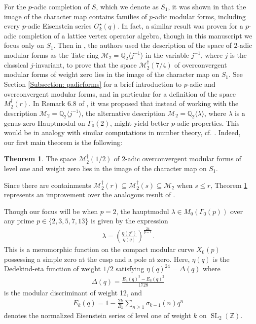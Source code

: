 \documentclass[10pt,a4paper]{amsart}
\numberwithin{equation}{section}
\theoremstyle{definition}
\newtheorem{Th}{Theorem}[section]
\newcommand{\Heis}{S}
\newcommand{\pHeis}{S_{1}}
\newcommand{\twomodforms}{\mathcal{M}_{2}}
\newcommand{\twooverconv}[1]{\twomodforms^{\dagger} (#1)}
\newcommand{\haupt}{\lambda}
\DeclareMathOperator{\SL}{SL}
\begin{document}
For the $p$-adic completion of $\Heis$, which we denote as $\pHeis$, it was shown in \cite{BF24} that the image of the character map contains families of $p$-adic modular forms, including every $p$-adic Eisenstein series $G_{k}^{\star}(q)$. In fact, a similar result was proven for a $p$-adic completion of a lattice vertex operator algebra, though in this manuscript we focus only on $\pHeis$. Then in \cite{FM23a}, the authors used the description of the space of $2$-adic modular forms as the Tate ring $\twomodforms = \mathbb{Q}_{2}\langle j^{-1} \rangle$ in the variable $j^{-1}$, where $j$ is the classical $j$-invariant, to prove that the space $\twooverconv{7/4}$ of overconvergent modular forms of weight zero lies in the image of the character map on $\pHeis$. See Section \ref{Subsection: padicforms} for a brief introduction to $p$-adic and overconvergent modular forms, and in particular for a definition of the space $M^\dagger_2(r)$. In Remark 6.8 of \cite{FM23a}, it was proposed that instead of working with the description $\twomodforms = \mathbb{Q}_{2}\langle j^{-1} \rangle$, the alternative description $\twomodforms = \mathbb{Q}_{2}\langle \haupt \rangle$, where $\haupt$ is a genus-zero Hauptmodul on $\Gamma_{0}(2)$, might yield better $p$-adic properties. This would be in analogy with similar computations in number theory, cf. \cite{BC05,BKK05}. Indeed, our first main theorem is the following:
\begin{Th} \label{Th: TheoremImage}
    The space $\twooverconv{1/2}$ of $2$-adic overconvergent modular forms of level one and weight zero lies in the image of the character map on $\pHeis$.
\end{Th}

Since there are containments $\twooverconv{r} \subseteq \twooverconv{s} \subseteq \mathcal{M}_2$ when $s \leq r$, Theorem \ref{Th: TheoremImage} represents an improvement over the analogous result of \cite{FM23a}.

Though our focus will be when $p=2$, the hauptmodul $\haupt \in M_{0} \left( \Gamma_{0}(p) \right)$ over any prime $p \in \lbrace 2,3,5,7,13 \rbrace$ is given by the expression
\begin{align*}
    \haupt = \left( \frac{\eta (q^{p})}{\eta (q)} \right)^{\frac{24}{p-1}}.
\end{align*}
This is a meromorphic function on the compact modular curve $X_{0}(p)$ possessing a simple zero at the cusp and a pole at zero. Here, $\eta (q)$ is the Dedekind-eta function of weight $1/2$ satisfying $\eta (q)^{24} = \Delta (q)$ where
\begin{align*}
    \Delta (q) = \frac{E_{4}(q)^{3} - E_{6}(q)^{2}}{1728}
\end{align*}
is the modular discriminant of weight 12, and
\begin{align*}
    E_{k}(q) = 1 - \frac{2k}{B_{k}} \sum_{n \geq 1} \sigma_{k-1}(n) q^{n}
\end{align*}
denotes the normalized Eisenstein series of level one of weight $k$ on $\SL_{2}(\mathbb{Z})$. 
\end{document}
